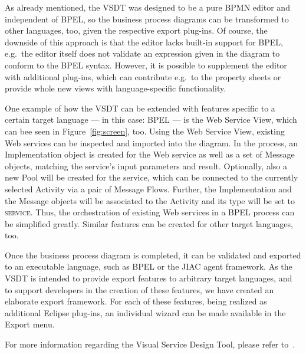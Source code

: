 As already mentioned, the VSDT was designed to be a pure BPMN editor and independent
of BPEL, so the business process diagrams can be transformed to other languages,
too, given the respective export plug-ins.  Of course, the downside of this approach
is that the editor lacks built-in support for BPEL, e.g.\ the editor itself does
not validate an expression given in the diagram to conform to the BPEL syntax.
However, it is possible to supplement the editor with additional plug-ins, which
can contribute e.g.\ to the property sheets or provide whole new views with
language-specific functionality.

One example of how the VSDT can be extended with features specific to a certain
target language --- in this case: BPEL --- is the Web Service View, which can bee
seen in Figure~\ref{fig:screen}, too.  Using the Web Service View, existing Web
services can be inspected and imported into the diagram.  In the process, an
Implementation object is created for the Web service as well as a set of Message
objects, matching the service's input parameters and result.  Optionally, also a
new Pool will be created for the service, which can be connected to the currently
selected Activity via a pair of Message Flows.  Further, the Implementation and
the Message objects will be associated to the Activity and its type will be set
to \textsc{service}.  Thus, the orchestration of existing Web services in a BPEL
process can be simplified greatly.  Similar features can be created for other
target languages, too.

Once the business process diagram is completed, it can be validated and exported
to an executable language, such as BPEL or the JIAC agent framework.  As the VSDT
is intended to provide export features to arbitrary target languages, and to
support developers in the creation of these features, we have created an elaborate
export framework.  For each of these features, being realized as additional
Eclipse plug-ins, an individual wizard can be made available in the Export menu.

For more information regarding the Visual Service Design Tool, please refer
to~\cite{kuester2008towards}.



